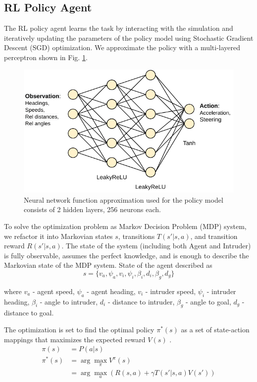 \subsection{RL Policy Agent}

The RL policy agent learns the task by interacting with the simulation and iteratively updating the parameters of the policy model using Stochastic Gradient Descent (SGD) optimization. We approximate the policy with a multi-layered perceptron shown in Fig. \ref{fig:policy_model}.

\begin{figure}[h]
	\centering
	\includegraphics[width=0.7\linewidth]{figures/model.pdf}
	\caption{Neural network function approximation used for the policy model consists of 2 hidden layers, 256 neurons each.}
	\label{fig:policy_model}
\end{figure}

To solve the optimization problem as Markov Decision Problem (MDP) system, we refactor it into Markovian states $s$, transitions  $T(s' | s, a)$, and transition reward $R(s' | s, a)$. 
The state of the system (including both Agent and Intruder) is fully observable, assumes the perfect knowledge, and is enough to describe the Markovian state of the MDP system.
State of the agent described as
$$ s = \{ v_a, \psi_a, v_i, \psi_i, \beta_i, d_i, \beta_g, d_g \}$$

where 
$v_a$ - agent speed,
$\psi_a$ - agent heading,
$v_i$ - intruder speed,
$\psi_i$ - intruder heading,
$\beta_i$ - angle to intruder,
$d_i$ - distance to intruder,
$\beta_g$ - angle to goal,
$d_g$ - distance to goal. 

The optimization is set to find the optimal policy $\pi^*(s)$ as a set of state-action mappings that maximizes the expected reward $V(s)$ \cite{sutton2018reinforcement}.
\begin{align} 
	\pi(s) &= P(a | s) \\
	\pi^*(s) &= \arg\max_{\pi} V^\pi (s) \\
	&= \arg\max_a \left( R(s,a) + \gamma T(s'|s,a) V(s') \right)
\end{align} 

